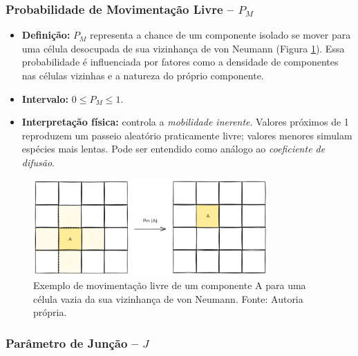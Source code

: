 \documentclass[12pt,oneside]{report}
\begin{document}
\subsubsection{Probabilidade de Movimentação Livre – \texorpdfstring{$P_M$}{Pm}}
\label{subsubsec:Pm}

\begin{itemize}
    \item \textbf{Definição:} $P_M$ representa a chance de um componente isolado se mover para uma célula desocupada de sua vizinhança de von Neumann (Figura \ref{fig:movimentacao_livre}). Essa probabilidade é influenciada por fatores como a densidade de componentes nas células vizinhas e a natureza do próprio componente.
    \item \textbf{Intervalo:} $0 \le P_M \le 1$.
    \item \textbf{Interpretação física:} controla a \textit{mobilidade inerente}.
          Valores próximos de 1 reproduzem um passeio aleatório praticamente livre; valores
          menores simulam espécies mais lentas. Pode ser entendido como análogo ao \textit{coeficiente de difusão}.
\end{itemize}

\begin{figure}[H]
    \centering
    \includegraphics[width=0.8\textwidth]{img/Pm.png}
    \caption{\small Exemplo de movimentação livre de um componente A para uma célula vazia da sua vizinhança de von Neumann. Fonte: Autoria própria.}
    \label{fig:movimentacao_livre}
\end{figure}

\subsubsection{Parâmetro de Junção – \texorpdfstring{$J$}{J}}
\label{subsubsec:J}
\end{document}
